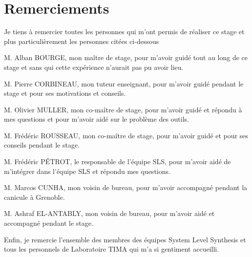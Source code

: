 \chapter*{Remerciements}
\justify
\setlength{\parindent}{0pt}
Je tiens à remercier toutes les personnes qui m'ont permis de réaliser ce stage et plus particulièrement les personnes citées ci-dessous

M. Alban BOURGE, mon maître de stage, pour m'avoir guidé tout au long de ce stage et sans qui cette expérience n'aurait pas pu avoir lieu.

M. Pierre CORBINEAU, mon tuteur enseignant, pour m'avoir guidé pendant le stage et pour ses motivations et conseils.

M. Olivier MULLER, mon co-maître de stage, pour m'avoir guidé et répondu à mes questions et pour m'avoir aidé sur le problème des outils.

M. Frédéric ROUSSEAU, mon co-maître de stage, pour m'avoir guidé et pour ses conseils pendant le stage.

M. Frédéric PÉTROT, le responsable de l'équipe SLS, pour m'avoir aidé de m'intégrer dans l'équipe SLS et répondu mes questions.

M. Marcos CUNHA, mon voisin de bureau, pour m'avoir accompagné pendant la canicule à Grenoble.

M. Ashraf EL-ANTABLY, mon voisin de bureau, pour m'avoir aidé et accompagné pendant le stage.

Enfin, je remercie l'ensemble des membres des équipes System Level Synthesis et tous les personnels de Laboratoire TIMA qui m'a si gentiment accueilli.
